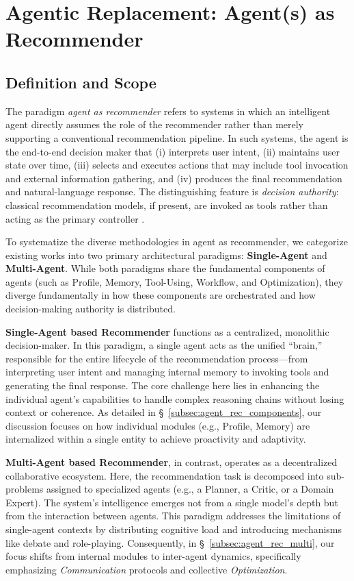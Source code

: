 
\section{Agentic Replacement: Agent(s) as Recommender}\label{sec:agent_as_recommender}

\subsection{Definition and Scope}\label{subsec:agent_rec_def}

{The paradigm \emph{agent as recommender} refers to systems in which an intelligent agent directly assumes the role of the recommender rather than merely supporting a conventional recommendation pipeline. In such systems, the agent is the end-to-end decision maker that (i) interprets user intent, (ii) maintains user state over time, (iii) selects and executes actions that may include tool invocation and external information gathering, and (iv) produces the final recommendation and natural-language response. The distinguishing feature is \emph{decision authority}: classical recommendation models, if present, are invoked as tools rather than acting as the primary controller \cite{huang2024interecagent,wang2024recmind}.} 


{
To systematize the diverse methodologies in agent as recommender, we categorize existing works into two primary architectural paradigms: \textbf{Single-Agent} and \textbf{Multi-Agent}. While both paradigms share the fundamental components of agents (such as Profile, Memory, Tool-Using, Workflow, and Optimization), they diverge fundamentally in how these components are orchestrated and how decision-making authority is distributed.
}


\textbf{Single-Agent based Recommender} functions as a centralized, monolithic decision-maker. In this paradigm, a single agent acts as the unified ``brain,'' responsible for the entire lifecycle of the recommendation process—from interpreting user intent and managing internal memory to invoking tools and generating the final response. The core challenge here lies in enhancing the individual agent's capabilities to handle complex reasoning chains without losing context or coherence. As detailed in \S~\ref{subsec:agent_rec_components}, our discussion focuses on how individual modules (e.g., Profile, Memory) are internalized within a single entity to achieve proactivity and adaptivity.

\textbf{Multi-Agent based Recommender}, in contrast, operates as a decentralized collaborative ecosystem. Here, the recommendation task is decomposed into sub-problems assigned to specialized agents (e.g., a Planner, a Critic, or a Domain Expert). The system's intelligence emerges not from a single model's depth but from the interaction between agents. This paradigm addresses the limitations of single-agent contexts by distributing cognitive load and introducing mechanisms like debate and role-playing. Consequently, in \S~\ref{subsec:agent_rec_multi}, our focus shifts from internal modules to inter-agent dynamics, specifically emphasizing \textit{Communication} protocols and collective \textit{Optimization}.

